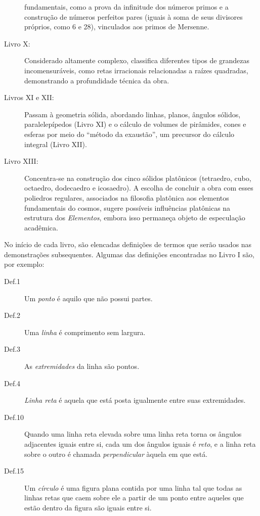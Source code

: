 \documentclass{hipatia}
\begin{document}
\begin{description}
		fundamentais, como a prova da infinitude dos números
		primos e a construção de números perfeitos pares
		(iguais à soma de seus divisores próprios, como 6 e
		28), vinculados aos primos de Mersenne.
	\item[Livro X:] Considerado altamente complexo,
		classifica diferentes tipos de grandezas
		incomensuráveis, como retas irracionais relacionadas a
		raízes quadradas, demonstrando a profundidade técnica
		da obra.
	\item[Livros XI e XII:] Passam à geometria sólida,
		abordando linhas, planos, ângulos sólidos,
		paralelepípedos (Livro XI) e o cálculo de volumes de
		pirâmides, cones e esferas por meio do ``método da
		exaustão'', um precursor do cálculo integral (Livro
		XII).
	\item[Livro XIII:] Concentra-se na construção
		dos cinco sólidos platônicos (tetraedro, cubo,
		octaedro, dodecaedro e icosaedro). A escolha
		de concluir a obra com esses poliedros
		regulares, associados na filosofia platônica
		aos elementos fundamentais do cosmos, sugere
		possíveis influências platônicas na estrutura
		dos \emph{Elementos}, embora isso permaneça objeto de
		especulação acadêmica. 
\end{description}

No início de cada livro, são elencadas 
definições de termos que serão usados nas
demonstrações  subsequentes. Algumas das
definições encontradas  
no Livro I são, por exemplo:
\begin{description}
\item[Def.1] Um \emph{ponto} é aquilo que não possui partes.
\item[Def.2] Uma \emph{linha} é comprimento sem largura.
\item[Def.3] As \emph{extremidades} da linha são pontos.
\item[Def.4] \emph{Linha reta} é aquela que está 
posta igualmente entre suas extremidades.
\item[Def.10] Quando uma linha reta elevada sobre uma 
linha reta torna os ângulos adjacentes iguais entre si, 
cada um dos ângulos iguais é \emph{reto}, e a linha
reta sobre o outro é chamada \emph{perpendicular}
àquela em que está.
\item[Def.15] Um \emph{círculo} é uma figura plana 
contida por uma linha tal que todas as linhas retas
que caem sobre ele a partir de um ponto entre aqueles
que estão dentro da figura são iguais entre si.
\end{description}
\end{document}
